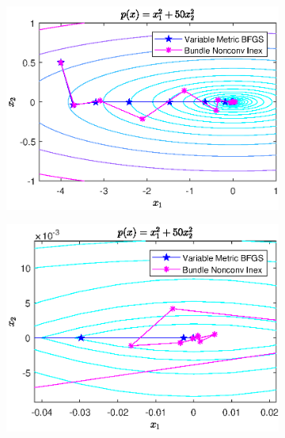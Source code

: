 \begin{figure}[H]
\begin{subfigure}[t]{0.49\textwidth}
		\includegraphics[width=\textwidth]{Pictures/Plots/final_parab.eps}
\end{subfigure}
\begin{subfigure}[t]{0.49\textwidth}
	\begin{center}
		\includegraphics[width=\textwidth]{Pictures/Plots/final_parab_detail.eps}
	\end{center}
\end{subfigure}
\caption{}
\label{Im_Parab}
\end{figure}

